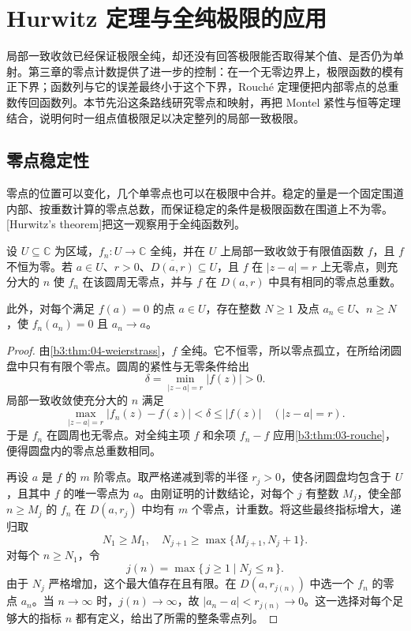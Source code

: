 \section{Hurwitz 定理与全纯极限的应用}
\label{b3:sec:0404}

局部一致收敛已经保证极限全纯，却还没有回答极限能否取得某个值、是否仍为单射。第三章的零点计数提供了进一步的控制：在一个无零边界上，极限函数的模有正下界；函数列与它的误差最终小于这个下界，Rouché 定理便把内部零点的总重数传回函数列。本节先沿这条路线研究零点和映射，再把 Montel 紧性与恒等定理结合，说明何时一组点值极限足以决定整列的局部一致极限。

\subsection{零点稳定性}
\label{b3:subsec:040401}

零点的位置可以变化，几个单零点也可以在极限中合并。稳定的量是一个固定围道内部、按重数计算的零点总数，而保证稳定的条件是极限函数在围道上不为零。[Hurwitz's theorem]把这一观察用于全纯函数列。

\begin{theorem}[Hurwitz]\label{b3:thm:04-hurwitz}
设 \(U\subseteq\mathbb C\) 为区域，\(f_n:U\rightarrow\mathbb C\) 全纯，并在 \(U\) 上局部一致收敛于有限值函数 \(f\)，且 \(f\) 不恒为零。若 \(a\in U\)、\(r>0\)、\(\overline{D(a,r)}\subseteq U\)，且 \(f\) 在 \(|z-a|=r\) 上无零点，则充分大的 \(n\) 使 \(f_n\) 在该圆周无零点，并与 \(f\) 在 \(D(a,r)\) 中具有相同的零点总重数。

\ProseParagraphBreak

此外，对每个满足 \(f(a)=0\) 的点 \(a\in U\)，存在整数 \(N\ge1\) 及点 \(a_n\in U\)、\(n\ge N\)，使 \(f_n(a_n)=0\) 且 \(a_n\rightarrow a\)。
\end{theorem}
\begin{proof}
由\cref{b3:thm:04-weierstrass}，\(f\) 全纯。它不恒零，所以零点孤立，在所给闭圆盘中只有有限个零点。圆周的紧性与无零条件给出
\[
 \delta=\min_{|z-a|=r}|f(z)|>0.
\]
局部一致收敛使充分大的 \(n\) 满足
\[
 \max_{|z-a|=r}|f_n(z)-f(z)|<\delta\le |f(z)|
 \quad(|z-a|=r).
\]
于是 \(f_n\) 在圆周也无零点。对全纯主项 \(f\) 和余项 \(f_n-f\) 应用\cref{b3:thm:03-rouche}，便得圆盘内的零点总重数相同。

再设 \(a\) 是 \(f\) 的 \(m\) 阶零点。取严格递减到零的半径 \(r_j>0\)，使各闭圆盘均包含于 \(U\)，且其中 \(f\) 的唯一零点为 \(a\)。由刚证明的计数结论，对每个 \(j\) 有整数 \(M_j\)，使全部 \(n\ge M_j\) 的 \(f_n\) 在 \(D(a,r_j)\) 中均有 \(m\) 个零点，计重数。将这些最终指标增大，递归取
\[
 N_1\ge M_1,\quad
 N_{j+1}\ge\max\{M_{j+1},N_j+1\}.
\]
对每个 \(n\ge N_1\)，令
\[
 j(n)=\max\{\,j\ge1\mid N_j\le n\,\}.
\]
由于 \(N_j\) 严格增加，这个最大值存在且有限。在 \(D(a,r_{j(n)})\) 中选一个 \(f_n\) 的零点 \(a_n\)。当 \(n\rightarrow\infty\) 时，\(j(n)\rightarrow\infty\)，故 \(|a_n-a|<r_{j(n)}\rightarrow0\)。这一选择对每个足够大的指标 \(n\) 都有定义，给出了所需的整条零点列。
\end{proof}

